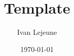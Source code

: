 
















\title{\color{astral} \sffamily \bfseries Template}
\author{Ivan Lejeune}
\date{\today}


    \maketitle
    \tableofcontents

    \newpage
    
    




